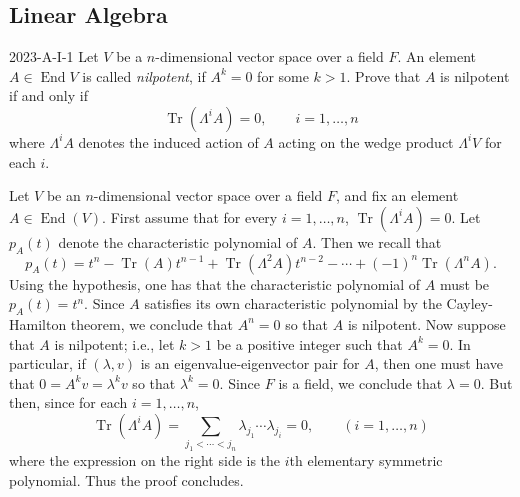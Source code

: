 \documentclass{article}
\begin{document}
	\subsection{Linear Algebra}
	
	\begin{prb}{2023-A-I-1}
		Let $V$ be a $n$-dimensional vector space over a field $F$. An element $A \in \operatorname{End}{V}$ is called \textit{nilpotent}, if $A^k = 0$ for some $k > 1$. Prove that $A$ is nilpotent if and only if 
		\begin{equation*}
			\operatorname{Tr}(\Lambda^{i} A) = 0, \qquad i= 1, \ldots, n
		\end{equation*}
		where $\Lambda^{i}A$ denotes the induced action of $A$ acting on the wedge product $\Lambda^{i}V$ for each $i$. 
	\end{prb}
	Let $V$ be an $n$-dimensional vector space over a field $F$, and fix an element $A \in \operatorname{End}(V)$. First assume that for every $i = 1, \ldots, n$, $\operatorname{Tr}(\Lambda^{i}A) = 0$. Let $p_{A}(t)$ denote the characteristic polynomial of $A$. Then we recall that 
	\begin{equation*}
		p_{A}(t) = t^{n} - \operatorname{Tr}(A)t^{n-1} + \operatorname{Tr}(\Lambda^{2}A)t^{n-2} - \dotsm + (-1)^{n}\operatorname{Tr}(\Lambda^{n}A). 
	\end{equation*}
	Using the hypothesis, one has that the characteristic polynomial of $A$ must be $p_A(t) = t^{n}$. Since $A$ satisfies its own characteristic polynomial by the Cayley-Hamilton theorem, we conclude that $A^{n} = 0$ so that $A$ is nilpotent. Now suppose that $A$ is nilpotent; i.e., let $k > 1$ be a positive integer such that $A^{k} =0$. In particular, if $(\lambda, v)$ is an eigenvalue-eigenvector pair for $A$, then one must have that $0 = A^{k}v = \lambda^{k}v$ so that $\lambda^{k} = 0$. Since $F$ is a field, we conclude that $\lambda = 0$. But then, since for each $i = 1, \ldots, n$, 
	\begin{equation*}
		\operatorname{Tr}(\Lambda^{i}A) = \sum_{j_1 < \dotsm < j_n}\lambda_{j_1}\dotsm \lambda_{j_i} = 0, \qquad (i = 1,\ldots,  n)
	\end{equation*}
	where the expression on the right side is the $i$th elementary symmetric polynomial. Thus the proof concludes. 
	
\end{document}
